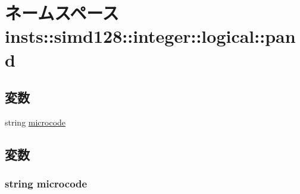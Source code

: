 \hypertarget{namespaceinsts_1_1simd128_1_1integer_1_1logical_1_1pand}{
\section{ネームスペース insts::simd128::integer::logical::pand}
\label{namespaceinsts_1_1simd128_1_1integer_1_1logical_1_1pand}
}
\subsection*{変数}
\begin{DoxyCompactItemize}
\item 
string \hyperlink{namespaceinsts_1_1simd128_1_1integer_1_1logical_1_1pand_a770f11a173e99389a8802f0107ed8f52}{microcode}
\end{DoxyCompactItemize}


\subsection{変数}
\hypertarget{namespaceinsts_1_1simd128_1_1integer_1_1logical_1_1pand_a770f11a173e99389a8802f0107ed8f52}{
\subsubsection[{microcode}]{\setlength{\rightskip}{0pt plus 5cm}string {\bf microcode}}}
\label{namespaceinsts_1_1simd128_1_1integer_1_1logical_1_1pand_a770f11a173e99389a8802f0107ed8f52}
